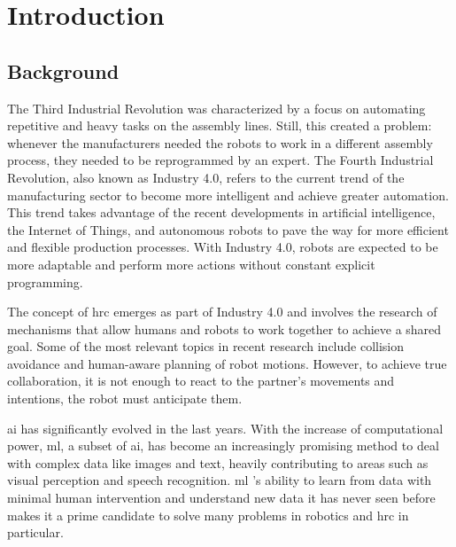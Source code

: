 \chapter{Introduction}
\label{chapter:introduction}


\section{Background}

The Third Industrial Revolution was characterized by a focus on automating repetitive and heavy tasks on the assembly lines. Still, this created a problem: whenever the manufacturers needed the robots to work in a different assembly process, they needed to be reprogrammed by an expert. The Fourth Industrial Revolution, also known as Industry 4.0, refers to the current trend of the manufacturing sector to become more intelligent and achieve greater automation. This trend takes advantage of the recent developments in artificial intelligence, the Internet of Things, and autonomous robots to pave the way for more efficient and flexible production processes. With Industry 4.0, robots are expected to be more adaptable and perform more actions without constant explicit programming.

The concept of \acf{hrc} emerges as part of Industry 4.0 and involves the research of mechanisms that allow humans and robots to work together to achieve a shared goal. Some of the most relevant topics in recent research include collision avoidance and human-aware planning of robot motions. However, to achieve true collaboration, it is not enough to react to the partner’s movements and intentions, the robot must anticipate them.

\acf{ai} has significantly evolved in the last years. With the increase of computational power, \acf{ml}, a subset of \acs{ai}, has become an increasingly promising method to deal with complex data like images and text, heavily contributing to areas such as visual perception and speech recognition. \acl{ml} ’s ability to learn from data with minimal human intervention and understand new data it has never seen before makes it a prime candidate to solve many problems in robotics and \acs{hrc} in particular.


